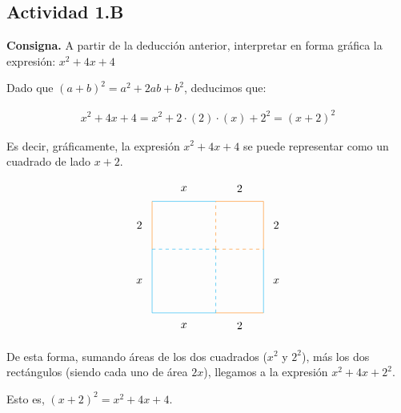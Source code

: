 \subsection*{Actividad 1.B}

\textbf{Consigna. }
A partir de la deducción anterior, interpretar en forma gráfica la expresión: $x^2 + 4x + 4$

Dado que $(a + b)^2 = a^2 + 2ab + b^2$,
deducimos que:

\begin{align*}
	x^2 + 4x + 4 = x^2 + 2\cdot(2)\cdot(x) + 2^{2} = (x + 2)^{2}
\end{align*} 

Es decir,
gráficamente,
la expresión $x^2 + 4x + 4$ se puede representar como un cuadrado de lado $x + 2$.

\begin{align*}
	\begin{tikzpicture}
		\draw[cyan] (0,0) -- (2,0);
		\draw[cyan] (0,0) -- (0,2);
		\draw[cyan,dashed] (2,0) -- (2,2);
		\draw[cyan,dashed] (0,2) -- (2,2);
		\draw (1, -0.4) node{$x$};
		\draw (-0.4, 1) node{$x$};
		\draw[orange,dashed] (2,2) -- (3.5,2);
		\draw[orange,dashed] (2,2) -- (2,3.5);
		\draw[orange] (3.5,2) -- (3.5,3.5);
		\draw[orange] (2,3.5) -- (3.5,3.5);
		\draw (3.9, 2.75) node{$2$};
		\draw (2.75, 3.9) node{$2$};
		\draw[orange] (2,0) -- (3.5,0);
		\draw (2.75, -0.4) node{$2$};
		\draw[cyan] (3.5, 0) -- (3.5, 2);
		\draw (3.9, 1) node{$x$};
		\draw[cyan] (0, 3.5) -- (2, 3.5);
		\draw (1, 3.9) node{$x$};
		\draw[orange] (0, 2) -- (0, 3.5);
		\draw (-0.4, 2.75) node{$2$};
	\end{tikzpicture}
\end{align*}

De esta forma, 
sumando áreas de los dos cuadrados (\(x^{2}\) y \(2^{2}\)),
más los dos rectángulos (siendo cada uno de área \(2x\)),
llegamos a la expresión \(x^2 + 4x + 2^2\).

Esto es,
$(x+2)^2 = x^2 + 4x +4$.

